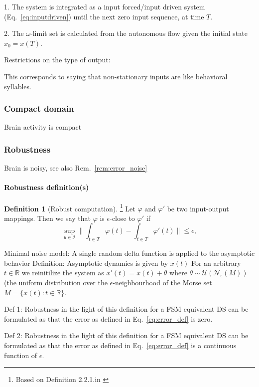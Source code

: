 \documentclass{scrartcl}
\theoremstyle{definition}
\newtheorem{definition}{Definition}
\theoremstyle{remark}
\newcommand{\reals}{\mathbb{R}}
\begin{document}
1. The system is integrated as a input forced/input driven system (Eq.~\ref{eq:inputdriven}) until the next zero input sequence, at time $T$.

2. The $\omega$-limit set is calculated from the autonomous flow given the initial state $x_0=x(T)$.



Restrictions on the type of output:

This corresponds to saying that non-stationary inputs are like behavioral syllables.


\subsubsection{Compact domain}
Brain activity is compact

\subsubsection{Robustness}
Brain is noisy, see also Rem.~\ref{rem:error_noise}

\paragraph{Robustness definition(s)}

\begin{definition}[Robust computation]\footnote{Based on Definition 2.2.1.in \citep{kuehn2015}}
 Let $\varphi$ and $\varphi'$ be two input-output mappings.
  Then we say that $\varphi$ is $\epsilon$-close to $\varphi'$ if
\begin{equation}\label{eq:error_def}
\sup_{u\in \mathcal{I}}\|\int_{t\in T}\varphi(t) - \int_{t\in T}\varphi'(t)\|  \leq \epsilon,
\end{equation}
\end{definition}


Minimal noise model: 
A single random delta function is applied to the asymptotic behavior
Definition:
Asymptotic dynamics is given by $x(t)$
For an arbitrary $t \in \reals$ we reinitilize the system as $x'(t)=x(t) + \theta$ where $\theta\sim \mathcal{U}(\mathcal{N}_\epsilon(M))$ (the uniform distribution over the $\epsilon$-neighbourhood of the Morse set $M=\{x(t)\colon t\in \reals\}$.

Def 1: Robustness in the light of this definition for a FSM equivalent DS can be formulated as that the error as defined in Eq.~\ref{eq:error_def} is zero.

Def 2: Robustness in the light of this definition for a FSM equivalent DS can be formulated as that the error as defined in Eq.~\ref{eq:error_def} is a continuous function of $\epsilon$.
\end{document}
